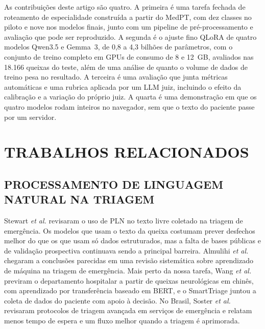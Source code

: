 \documentclass{ieeeaccess}
\begin{document}
As contribui\c{c}\~oes deste artigo s\~ao quatro. A primeira \'e uma tarefa fechada de roteamento de especialidade constru\'ida a partir do MedPT, com dez classes no piloto e nove nos modelos finais, junto com um pipeline de pr\'e-processamento e avalia\c{c}\~ao que pode ser reproduzido. A segunda \'e o ajuste fino QLoRA de quatro modelos Qwen3.5 e Gemma~3, de 0,8 a 4,3 bilh\~oes de par\^ametros, com o conjunto de treino completo em GPUs de consumo de 8 e 12~GB, avaliados nas 18.166 queixas do teste, al\'em de uma an\'alise de quanto o volume de dados de treino pesa no resultado. A terceira \'e uma avalia\c{c}\~ao que junta m\'etricas autom\'aticas e uma rubrica aplicada por um LLM juiz, incluindo o efeito da calibra\c{c}\~ao e a varia\c{c}\~ao do pr\'oprio juiz. A quarta \'e uma demonstra\c{c}\~ao em que os quatro modelos rodam inteiros no navegador, sem que o texto do paciente passe por um servidor.

\section{TRABALHOS RELACIONADOS}
\label{sec:relacionados}

\subsection{PROCESSAMENTO DE LINGUAGEM NATURAL NA TRIAGEM}
Stewart \emph{et al.} \cite{b1} revisaram o uso de PLN no texto livre coletado na triagem de emerg\^encia. Os modelos que usam o texto da queixa costumam prever desfechos melhor do que os que usam s\'o dados estruturados, mas a falta de bases p\'ublicas e de valida\c{c}\~ao prospectiva continuava sendo a principal barreira. Almulihi \emph{et al.} \cite{b5} chegaram a conclus\~oes parecidas em uma revis\~ao sistem\'atica sobre aprendizado de m\'aquina na triagem de emerg\^encia. Mais perto da nossa tarefa, Wang \emph{et al.} \cite{b14} previram o departamento hospitalar a partir de queixas neurol\'ogicas em chin\^es, com aprendizado por transfer\^encia baseado em BERT, e o SmartTriage \cite{b15} juntou a coleta de dados do paciente com apoio \`a decis\~ao. No Brasil, Soster \emph{et al.} \cite{b2} revisaram protocolos de triagem avan\c{c}ada em servi\c{c}os de emerg\^encia e relatam menos tempo de espera e um fluxo melhor quando a triagem \'e aprimorada.
\end{document}
